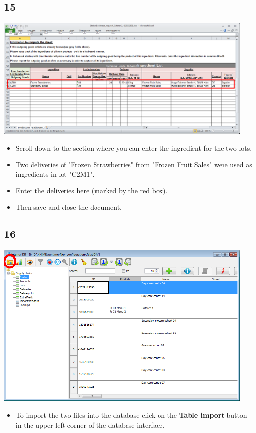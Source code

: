 \documentclass{beamer}
\begin{document}
\subsection{15}
\begin{frame}
	\begin{center}
 		\includegraphics[width=0.95\textwidth]{15.png}
	\end{center}
	\begin{itemize}
		\item Scroll down to the section where you can enter the ingredient for the two lots.
		\item Two deliveries of "Frozen Strawberries" from "Frozen Fruit Sales" were used as ingredients in lot "C2M1".
		\item Enter the deliveries here (marked by the red box).
		\item Then save and close the document.
	\end{itemize}
\end{frame}

\subsection{16}
\begin{frame}
	\begin{center}
  		\includegraphics[width=0.95\textwidth]{16.png}
	\end{center}
	\begin{itemize}
		\item To import the two files into the database click on the \textbf{Table import} button in the upper left corner of the database interface.
	\end{itemize}
\end{frame}
\end{document}
